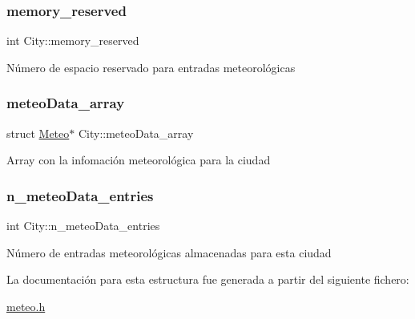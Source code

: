 \subsubsection{\texorpdfstring{memory\+\_\+reserved}{memory\_reserved}}
{\footnotesize\ttfamily int City\+::memory\+\_\+reserved}

Número de espacio reservado para entradas meteorológicas \mbox{\label{struct_city_ac2402d56376a07836fa62dca29c89dab}} 
\subsubsection{\texorpdfstring{meteo\+Data\+\_\+array}{meteoData\_array}}
{\footnotesize\ttfamily struct \hyperlink{struct_meteo}{Meteo}$\ast$ City\+::meteo\+Data\+\_\+array}

Array con la infomación meteorológica para la ciudad \mbox{\label{struct_city_a6951eca7655b259b4304a3e354c09b55}} 
\subsubsection{\texorpdfstring{n\+\_\+meteo\+Data\+\_\+entries}{n\_meteoData\_entries}}
{\footnotesize\ttfamily int City\+::n\+\_\+meteo\+Data\+\_\+entries}

Número de entradas meteorológicas almacenadas para esta ciudad 

La documentación para esta estructura fue generada a partir del siguiente fichero\+:\begin{DoxyCompactItemize}
\item 
\hyperlink{meteo_8h}{meteo.\+h}\end{DoxyCompactItemize}
